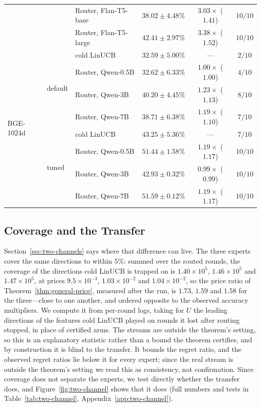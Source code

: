 \documentclass[anon]{alt2027} %
\begin{document}
\begin{table}[h]
\begin{tabular}{@{}lllccc@{}}
& & Router, Flan-T5-base & $38.02\pm4.48\%$ & $3.03\times$ ($1.41$) & $10/10$ \\
& & Router, Flan-T5-large & $42.41\pm2.97\%$ & $3.38\times$ ($1.52$) & $10/10$ \\
\midrule
\multirow{8}{*}{BGE-1024d} & \multirow{4}{*}{default} & cold LinUCB & $32.59\pm5.00\%$ & --- & $2/10$ \\
& & Router, Qwen-0.5B & $32.62\pm6.33\%$ & $1.00\times$ ($1.00$) & $4/10$ \\
& & Router, Qwen-3B & $40.20\pm4.45\%$ & $1.23\times$ ($1.13$) & $8/10$ \\
& & Router, Qwen-7B & $38.71\pm6.38\%$ & $1.19\times$ ($1.10$) & $7/10$ \\
\cmidrule(lr){2-6}
& \multirow{4}{*}{tuned} & cold LinUCB & $43.25\pm5.36\%$ & --- & $7/10$ \\
& & Router, Qwen-0.5B & $51.44\pm1.58\%$ & $1.19\times$ ($1.17$) & $10/10$ \\
& & Router, Qwen-3B & $42.93\pm0.32\%$ & $0.99\times$ ($0.99$) & $10/10$ \\
& & Router, Qwen-7B & $51.59\pm0.12\%$ & $1.19\times$ ($1.17$) & $10/10$ \\
\bottomrule
\end{tabular}
\end{table}

\subsection{Coverage and the Transfer}
\label{app:amazon-transfer}

Section~\ref{sec:two-channels} says where that difference can live. The three
experts cover the same directions to within $5\%$: summed over the routed
rounds, the coverage of the directions cold LinUCB is trapped on is
$1.40\times10^5$, $1.46\times10^5$ and $1.47\times10^5$, at prices
$9.5\times10^{-3}$, $1.03\times10^{-2}$ and $1.04\times10^{-2}$, so the price
ratio of Theorem~\ref{thm:general-price}, measured after the run, is $1.73$,
$1.59$ and $1.58$ for the three---close to one another, and ordered opposite
to the observed accuracy multipliers. We compute it from per-round logs, taking for $U$
the leading directions of the features cold LinUCB played on rounds it lost
after routing stopped, in place of certified arms. The streams are outside
the theorem's setting, so this is an explanatory statistic rather than a
bound the theorem certifies, and by construction it is blind to the
transfer. It bounds the regret ratio, and the observed regret ratios lie
below it for every expert; since the real stream is outside the theorem's
setting we read this as consistency, not confirmation. Since coverage does
not separate the experts, we test directly whether the transfer does, and
Figure~\ref{fig:two-channel} shows that it does (full numbers and tests in
Table~\ref{tab:two-channel}, Appendix~\ref{app:two-channel}).
\end{document}
